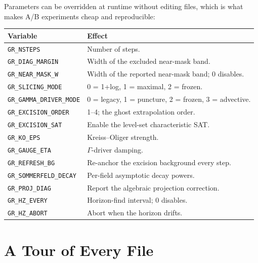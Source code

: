 \documentclass[11pt,openany]{book}
\begin{document}
Parameters can be overridden at runtime without editing files, which is what
makes A/B experiments cheap and reproducible:

\begin{center}
\begin{tabular}{@{}ll@{}}
\toprule
\textbf{Variable} & \textbf{Effect} \\
\midrule
\texttt{GR\_NSTEPS} & Number of steps. \\
\texttt{GR\_DIAG\_MARGIN} & Width of the excluded near-mask band. \\
\texttt{GR\_NEAR\_MASK\_W} & Width of the reported near-mask band; 0 disables. \\
\texttt{GR\_SLICING\_MODE} & 0 = 1+log, 1 = maximal, 2 = frozen. \\
\texttt{GR\_GAMMA\_DRIVER\_MODE} & 0 = legacy, 1 = puncture, 2 = frozen, 3 = advective. \\
\texttt{GR\_EXCISION\_ORDER} & 1--4; the ghost extrapolation order. \\
\texttt{GR\_EXCISION\_SAT} & Enable the level-set characteristic SAT. \\
\texttt{GR\_KO\_EPS} & Kreiss--Oliger strength. \\
\texttt{GR\_GAUGE\_ETA} & $\Gamma$-driver damping. \\
\texttt{GR\_REFRESH\_BG} & Re-anchor the excision background every step. \\
\texttt{GR\_SOMMERFELD\_DECAY} & Per-field asymptotic decay powers. \\
\texttt{GR\_PROJ\_DIAG} & Report the algebraic projection correction. \\
\texttt{GR\_HZ\_EVERY} & Horizon-find interval; 0 disables. \\
\texttt{GR\_HZ\_ABORT} & Abort when the horizon drifts. \\
\bottomrule
\end{tabular}
\end{center}

\chapter{A Tour of Every File}
\label{ch:tour}
\end{document}
